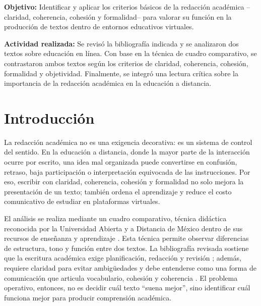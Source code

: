 \documentclass[
	spanish, %
	letterpaper, oneside
]{article}
\begin{document}
\templatePortrait

\templatePagecfg

\begin{abstractd}
	\textbf{Objetivo:} Identificar y aplicar los criterios básicos de la redacción académica --claridad, coherencia, cohesión y formalidad-- para valorar su función en la producción de textos dentro de entornos educativos virtuales.

	\textbf{Actividad realizada:} Se revisó la bibliografía indicada y se analizaron dos textos sobre educación en línea. Con base en la técnica de cuadro comparativo, se contrastaron ambos textos según los criterios de claridad, coherencia, cohesión, formalidad y objetividad. Finalmente, se integró una lectura crítica sobre la importancia de la redacción académica en la educación a distancia.
\end{abstractd}

\templateIndex

\templateFinalcfg


\section{Introducción}

La redacción académica no es una exigencia decorativa: es un sistema de control del sentido. En la educación a distancia, donde la mayor parte de la interacción ocurre por escrito, una idea mal organizada puede convertirse en confusión, retraso, baja participación o interpretación equivocada de las instrucciones. Por eso, escribir con claridad, coherencia, cohesión y formalidad no solo mejora la presentación de un texto; también ordena el aprendizaje y reduce el costo comunicativo de estudiar en plataformas virtuales.

El análisis se realiza mediante un cuadro comparativo, técnica didáctica reconocida por la Universidad Abierta y a Distancia de México dentro de sus recursos de enseñanza y aprendizaje \citep{unadm100TecnicasDidacticas2023}. Esta técnica permite observar diferencias de estructura, tono y función entre dos textos. La bibliografía revisada sostiene que la escritura académica exige planificación, redacción y revisión \citep{nunezcortesEscrituraAcademicaTeoria2015}; además, requiere claridad para evitar ambigüedades \citep{ayalaTallerLecturaRedaccion2010} y debe entenderse como una forma de comunicación que articula vocabulario, cohesión y coherencia \citep{vitoriaEscrituraAcademicaFormacion2019}. El problema operativo, entonces, no es decidir cuál texto ``suena mejor'', sino identificar cuál funciona mejor para producir comprensión académica.
\end{document}
